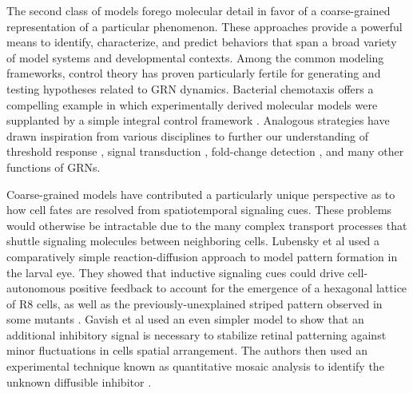 The second class of models forego molecular detail in favor of a coarse-grained representation of a particular phenomenon. These approaches provide a powerful means to identify, characterize, and predict behaviors that span a broad variety of model systems and developmental contexts. Among the common modeling frameworks, control theory has proven particularly fertile for generating and testing hypotheses related to GRN dynamics. Bacterial chemotaxis offers a compelling example in which experimentally derived molecular models were supplanted by a simple integral control framework \cite{Barkai1997,Alon1999,Yi2000}. Analogous strategies have drawn inspiration from various disciplines to further our understanding of threshold response \cite{Melen2005,Graham2010}, signal transduction \cite{Benziger2018}, fold-change detection \cite{Adler2018}, and many other functions of GRNs.

Coarse-grained models have contributed a particularly unique perspective as to how cell fates are resolved from spatiotemporal signaling cues. These problems would otherwise be intractable due to the many complex transport processes that shuttle signaling molecules between neighboring cells. Lubensky et al used a comparatively simple reaction-diffusion approach to model pattern formation in the larval eye. They showed that inductive signaling cues could drive cell-autonomous positive feedback to account for the emergence of a hexagonal lattice of R8 cells, as well as the previously-unexplained striped pattern observed in some mutants \cite{Lubensky2011}. Gavish et al used an even simpler model to show that an additional inhibitory signal is necessary to stabilize retinal patterning against minor fluctuations in cells spatial arrangement. The authors then used an experimental technique known as quantitative mosaic analysis to identify the unknown diffusible inhibitor \cite{Gavish2016}.

